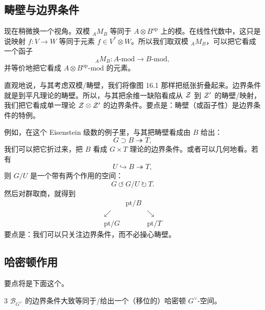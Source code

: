 \subsection{畴壁与边界条件}

现在稍微换一个视角。双模 ${}_AM_B$ 等同于 $A\otimes B^{\mathrm{op}}$ 上的模。在线性代数中，这只是说映射 $f:V\to W$ 等同于元素 $f\in V^*\otimes W$。所以我们取双模 ${}_AM_B$，可以把它看成一个函子
\begin{equation}\tag{16.79}
{}_AM_B:A\text{-}\mathrm{mod}\to B\text{-}\mathrm{mod},
\end{equation}
并等价地把它看成 $A\otimes B^{\mathrm{op}}\text{-}\mathrm{mod}$ 的元素。

直观地说，与其考虑双模/畴壁，我们将像图 16.1 那样把纸张折叠起来。边界条件就是到平凡理论的畴壁。所以，与其把余维一缺陷看成从 $\mathcal{Z}$ 到 $\mathcal{Z}'$ 的畴壁/映射，我们把它看成单一理论 $\mathcal{Z}\otimes\mathcal{Z}'$ 的边界条件。要点是：畴壁（或函子性）是边界条件的特例。

例如，在这个 Eisenstein 级数的例子里，与其把畴壁看成由 $B$ 给出：
\begin{equation}\tag{16.80}
G\supset B\twoheadrightarrow T,
\end{equation}
我们可以把它折过来，把 $B$ 看成 $G\times T$ 理论的边界条件。或者可以几何地看。若有
\begin{equation}\tag{16.81}
U\hookrightarrow B\twoheadrightarrow T,
\end{equation}
则 $G/U$ 是一个带有两个作用的空间：
\begin{equation}\tag{16.82}
G\ \circlearrowleft\ G/U\ \circlearrowright\ T.
\end{equation}
然后对群取商，就得到
\begin{equation}\tag{16.83}
\begin{array}{ccc}
& \mathrm{pt}/B &\\
\swarrow & & \searrow\\
\mathrm{pt}/G & & \mathrm{pt}/T
\end{array}
\end{equation}
要点是：我们可以只关注边界条件，而不必操心畴壁。

\subsection{哈密顿作用}

要点将是下面这个。

\begin{srcclaim}{3}
$\mathcal{B}_{G^\vee}$ 的边界条件大致等同于/给出一个（移位的）哈密顿 $G^\vee$-空间。
\end{srcclaim}

